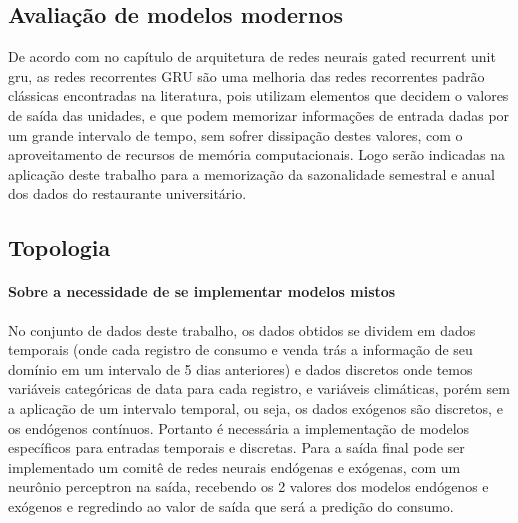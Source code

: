 \documentclass[	12pt, Times, openright, twoside, a4paper, english, brazil]{abntex2}
\begin{document}
        \subsection{Avaliação de modelos modernos}
         	De acordo com \cite{DLB} no capítulo de arquitetura de redes neurais gated recurrent unit gru, as redes recorrentes GRU são uma melhoria das redes recorrentes padrão clássicas encontradas na literatura, pois utilizam elementos que decidem o valores de saída das unidades, e que podem memorizar informações de entrada dadas por um grande intervalo de tempo, sem sofrer dissipação destes valores, com o aproveitamento de recursos de memória computacionais. Logo serão indicadas na aplicação deste trabalho para a memorização da sazonalidade semestral e anual dos dados do restaurante universitário.
            \begin{figure}[H]
            \end{figure}
        \subsection{Topologia}
            \paragraph*{Sobre a necessidade de se implementar modelos mistos}
                No conjunto de dados deste trabalho, os dados obtidos se dividem em dados temporais (onde cada registro de consumo e venda trás a informação de seu domínio em um intervalo de 5 dias anteriores) e dados discretos onde temos variáveis categóricas de data para cada registro, e variáveis climáticas, porém sem a aplicação de um intervalo temporal, ou seja, os dados exógenos são discretos, e os endógenos contínuos.
                Portanto é necessária a implementação de modelos específicos para entradas temporais e discretas.
                Para a saída final pode ser implementado um comitê de redes neurais endógenas e exógenas, com um neurônio perceptron na saída, recebendo os 2 valores dos modelos endógenos e exógenos e regredindo ao valor de saída que será a predição do consumo.
\end{document}
